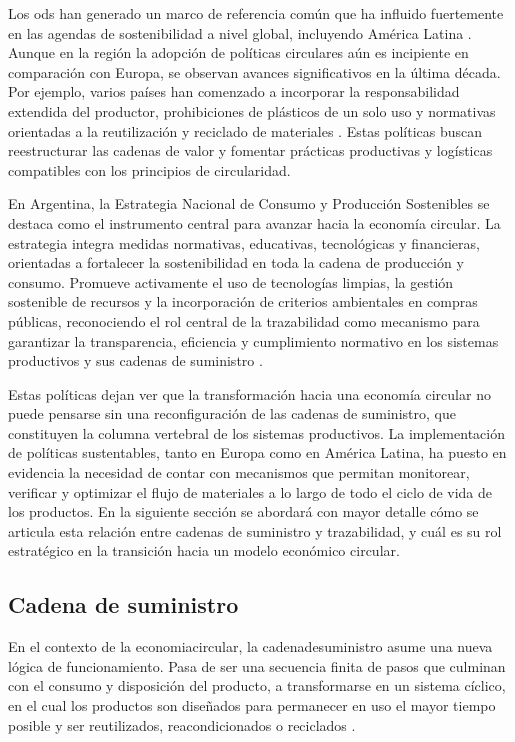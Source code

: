 Los \acrshort{ods} han generado un marco de referencia común que ha influido fuertemente en las agendas de \gls{sostenibilidad} a nivel global, incluyendo América Latina \cite{sostenible2021argentina}. Aunque en la región la adopción de políticas circulares aún es incipiente en comparación con Europa, se observan avances significativos en la última década. Por ejemplo, varios países han comenzado a incorporar la responsabilidad extendida del productor, prohibiciones de plásticos de un solo uso y normativas orientadas a la reutilización y reciclado de materiales \cite{cepal2021economia}. Estas políticas buscan reestructurar las cadenas de valor y fomentar prácticas productivas y logísticas compatibles con los principios de circularidad.

En Argentina, la Estrategia Nacional de Consumo y Producción Sostenibles se destaca como el instrumento central para avanzar hacia la economía circular. La estrategia integra medidas normativas, educativas, tecnológicas y financieras, orientadas a fortalecer la sostenibilidad en toda la cadena de producción y consumo. Promueve activamente el uso de tecnologías limpias, la gestión sostenible de recursos y la incorporación de criterios ambientales en compras públicas, reconociendo el rol central de la trazabilidad como mecanismo para garantizar la transparencia, eficiencia y cumplimiento normativo en los sistemas productivos y sus cadenas de suministro \cite{sostenible2021argentina}.

Estas políticas dejan ver que la transformación hacia una economía circular no puede pensarse sin una reconfiguración de las cadenas de suministro, que constituyen la columna vertebral de los sistemas productivos. La implementación de políticas sustentables, tanto en Europa como en América Latina, ha puesto en evidencia la necesidad de contar con mecanismos que permitan monitorear, verificar y optimizar el flujo de materiales a lo largo de todo el ciclo de vida de los productos. En la siguiente sección se abordará con mayor detalle cómo se articula esta relación entre cadenas de suministro y \gls{trazabilidad}, y cuál es su rol estratégico en la transición hacia un modelo económico circular.

\subsection{Cadena de suministro}
\label{sec:supply-chain}

En el contexto de la \gls{economiacircular}, la \gls{cadenadesuministro} asume una nueva lógica de funcionamiento. Pasa de ser una secuencia finita de pasos que culminan con el consumo y disposición del producto, a transformarse en un sistema cíclico, en el cual los productos son diseñados para permanecer en uso el mayor tiempo posible y ser reutilizados, reacondicionados o reciclados \cite{cerda2016economia}. 


